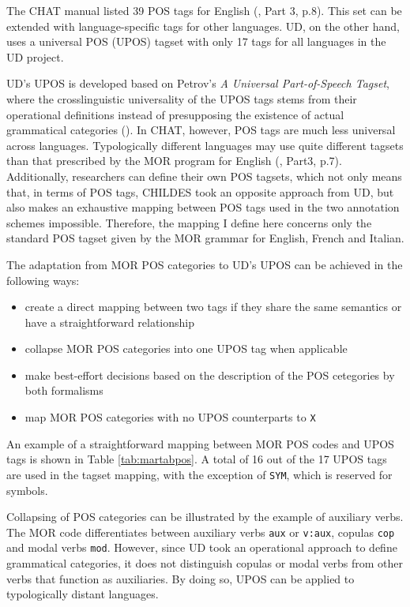 The CHAT manual listed 39 POS tags for English (\cite{Macwhinney2000}, Part 3, p.8). This set can be extended with language-specific tags for other languages. UD, on the other hand, uses a universal POS (UPOS) tagset with only 17 tags for all languages in the UD project.

UD's UPOS is developed based on Petrov's \emph{A Universal Part-of-Speech Tagset}, where the crosslinguistic universality of the UPOS tags stems from their operational definitions instead of presupposing the existence of actual grammatical categories (\cite{petrov2012}). In CHAT, however, POS tags are much less universal across languages. Typologically different languages may use quite different tagsets than that prescribed by the MOR program for English (\cite{Macwhinney2000}, Part3, p.7). Additionally, researchers can define their own POS tagsets, which not only means that, in terms of POS tags, CHILDES took an opposite approach from UD, but also makes an exhaustive mapping between POS tags used in the two annotation schemes impossible. Therefore, the mapping I define here concerns only the standard POS tagset given by the MOR grammar for English, French and Italian.

The adaptation from MOR POS categories to UD's UPOS can be achieved in the following ways:
\begin{itemize}
	\item create a direct mapping between two tags if they share the same semantics or have a straightforward relationship
	\item collapse MOR POS categories into one UPOS tag when applicable
	\item make best-effort decisions based on the description of the POS cetegories by both formalisms
	\item map MOR POS categories with no UPOS counterparts to \texttt{X}
\end{itemize}

An example of a straightforward mapping between MOR POS codes and UPOS tags is shown in Table \ref{tab:martabpos}. A total of 16 out of the 17 UPOS tags are used in the tagset mapping, with the exception of \texttt{SYM}, which is reserved for symbols.

Collapsing of POS categories can be illustrated by the example of auxiliary verbs. The MOR code differentiates between auxiliary verbs \texttt{aux} or \texttt{v:aux}, copulas \texttt{cop} and modal verbs \texttt{mod}. However, since UD took an operational approach to define grammatical categories, it does not distinguish copulas or modal verbs from other verbs that function as auxiliaries. By doing so, UPOS can be applied to typologically distant languages.

